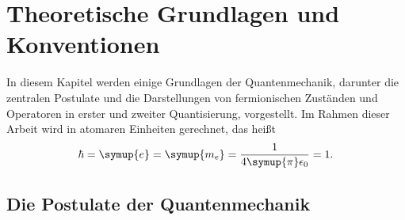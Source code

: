 \chapter{Theoretische Grundlagen und Konventionen}
\label{ch:theorie}

In diesem Kapitel werden einige Grundlagen der Quantenmechanik, darunter die zentralen Postulate
und die Darstellungen von fermionischen Zuständen und Operatoren in erster und zweiter Quantisierung, vorgestellt.
Im Rahmen dieser Arbeit wird in atomaren Einheiten gerechnet, das heißt
\begin{align*}
  \hbar = \symup{e} = \symup{m_e} = \frac{1}{4\symup{\pi}\epsilon_0} = 1.
\end{align*}

\section{Die Postulate der Quantenmechanik}
\label{sec:schroedingergleichung}

